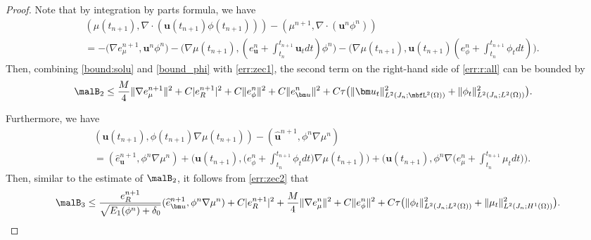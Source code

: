 \begin{proof}
	Note that by integration by parts formula, we have
	\begin{equation} \label{err:zec1}
		\begin{aligned}
			& (\mu(t_{n+1}), \nabla \cdot (\bm u(t_{n+1}) \phi(t_{n+1}))) - (\mu^{n+1},  \nabla \cdot( \bm u^n \phi^n)) \\
			&  = -\big( \nabla e_\mu^{n+1},  \bm u^{n}\phi^n\big) 
			-\big(\nabla{\mu(t_{n+1})}, (e^{n}_{\bm u} + \int_{t_n}^{t_{n+1}}{\bm u}_t dt) \phi^n \big) 
		  -  \big(\nabla {\mu(t_{n+1})},  \bm u(t_{n+1})(e^{n}_\phi +\int_{t_n}^{t_{n+1}}\phi_t dt ) \big).
		\end{aligned}
	\end{equation}
	Then, combining  \eqref{bound:solu} and  \eqref{bound_phi} with \eqref{err:zec1}, the second term on the right-hand side of  \eqref{err:r:all} can be bounded by
	\begin{equation*} 
		\begin{aligned}
			\malB_2       & \le 
			\frac{ M}{4} \|\nabla e_{\mu}^{n+1}\|^2 +  C|e_R^{n+1}|^2 + C \| e_{\phi}^n\|^2 + C\| e_{\bm u}^{n}\|^2 + C\tau\big( \|\bm u_t\|_{L^2(J_n ; \mbfL^2(\Omega))}^2  +  \|\phi_t\|_{L^2(J_n ; L^2(\Omega))}^2\big).
		\end{aligned}
	\end{equation*}
	
	Furthermore, we have
	\begin{equation} \label{err:zec2}
		\begin{aligned} 
			& (\bm u(t_{n+1}), \phi(t_{n+1}) \nabla \mu(t_{n+1}))-(\widehat{\bm u}^{n+1}, \phi^n \nabla \mu^n) \\
			&  =   (\widehat{e}_{\bm u}^{n+1}, \phi^n \nabla \mu^n) 
			+ \big(\bm u(t_{n+1}),\big(e_\phi^n+\int_{t_n}^{t_{n+1}} \phi_t d t\big)\nabla \mu(t_{n+1})  \big)  
			 +  \big(\bm u(t_{n+1}), \phi^n \nabla \big(e_\mu^n+\int_{t_n}^{t_{n+1}} \mu_t d t\big) \big).
		\end{aligned}
	\end{equation}
	Then, similar to the estimate of $ \malB_2 $, it follows from \eqref{err:zec2} that
	\begin{equation*}
			\malB_3       \le \frac{e_R^{n+1}}  {\sqrt{E_1(\phi^n)+\delta_0}} (\widehat{e}_{\bm u}^{n+1}, \phi^n \nabla \mu^n) + C|e_R^{n+1}|^2+  \frac{M}{4}\|\nabla e_{\mu}^{n}\|^2 + C\|e_{\phi}^n\|^2
			    +C\tau \big(\|\phi_t\|_{L^2(J_n ; L^2(\Omega))}^2 + \|\mu_t\|_{L^2(J_n ; H^1(\Omega))}^2\big).
	\end{equation*}
	

\end{proof}
